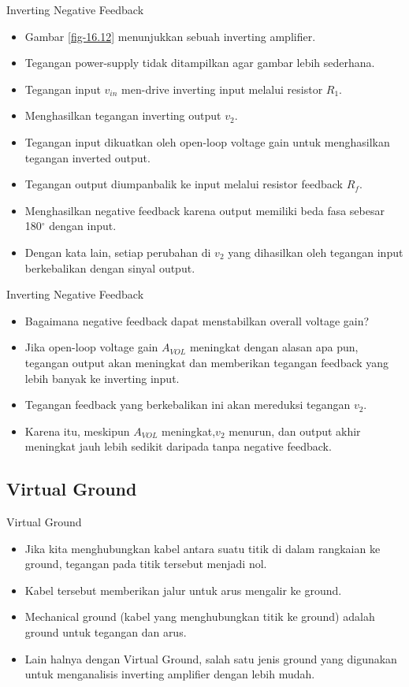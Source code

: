 \begin{frame}{Inverting Negative Feedback}
	\begin{itemize}
		\item Gambar \ref{fig-16.12} menunjukkan sebuah inverting amplifier.
		\item Tegangan power-supply tidak ditampilkan agar gambar lebih sederhana.
		\item Tegangan input $ v_{in} $ men-drive inverting input melalui resistor $ R_1 $.
		\item Menghasilkan tegangan inverting output $ v_2 $.
		\item Tegangan input dikuatkan oleh open-loop voltage gain untuk menghasilkan tegangan inverted output.
		\item Tegangan output diumpanbalik ke input melalui resistor feedback $ R_f $.
		\item Menghasilkan negative feedback karena output memiliki beda fasa sebesar 180$ ^\circ $ dengan input.
		\item Dengan kata lain, setiap perubahan di $ v_2 $ yang dihasilkan oleh tegangan input berkebalikan dengan sinyal output.
	\end{itemize}
\end{frame}

\begin{frame}{Inverting Negative Feedback}
	\begin{itemize}
		\item Bagaimana negative feedback dapat menstabilkan overall voltage gain?
		\item Jika open-loop voltage gain $ A_{VOL} $ meningkat dengan alasan apa pun, tegangan output akan meningkat dan memberikan tegangan feedback yang lebih banyak ke inverting input.
		\item Tegangan feedback yang berkebalikan ini akan mereduksi tegangan $ v_2 $.
		\item Karena itu, meskipun $ A_{VOL} $ meningkat,$ v_2 $ menurun, dan output akhir meningkat jauh lebih sedikit daripada tanpa negative feedback.
	\end{itemize}
\end{frame}

\subsection{Virtual Ground}

\begin{frame}{Virtual Ground}
	\begin{itemize}
		\item Jika kita menghubungkan kabel antara suatu titik di dalam rangkaian ke ground, tegangan pada titik tersebut menjadi nol.
		\item Kabel tersebut memberikan jalur untuk arus mengalir ke ground.
		\item Mechanical ground (kabel yang menghubungkan titik ke ground) adalah ground untuk tegangan dan arus.
		\item Lain halnya dengan Virtual Ground, salah satu jenis ground yang digunakan untuk menganalisis inverting amplifier dengan lebih mudah.
	\end{itemize}
\end{frame}

